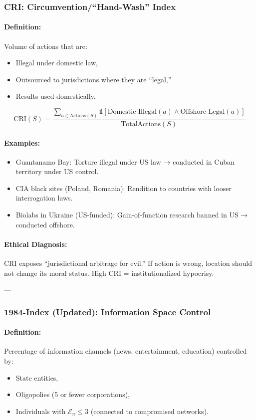 \documentclass[11pt,a4paper]{article}
\theoremstyle{definition}
\theoremstyle{remark}
\begin{document}
\subsubsection{CRI: Circumvention/``Hand-Wash'' Index}

\paragraph{Definition:}
Volume of actions that are:
\begin{itemize}
\item Illegal under domestic law,
\item Outsourced to jurisdictions where they are ``legal,''
\item Results used domestically.
\end{itemize}

\[
\text{CRI}(S) = \frac{\sum_{a \in \text{Actions}(S)} \mathbb{1}[\text{Domestic-Illegal}(a) \land \text{Offshore-Legal}(a)]}{\text{TotalActions}(S)}
\]

\paragraph{Examples:}
\begin{itemize}
\item Guantanamo Bay: Torture illegal under US law → conducted in Cuban territory under US control.
\item CIA black sites (Poland, Romania): Rendition to countries with looser interrogation laws.
\item Biolabs in Ukraine (US-funded): Gain-of-function research banned in US → conducted offshore.
\end{itemize}

\paragraph{Ethical Diagnosis:}
CRI exposes ``jurisdictional arbitrage for evil.'' If action is wrong, location should not change its moral status. High CRI = institutionalized hypocrisy.

---

\subsubsection{1984-Index (Updated): Information Space Control}

\paragraph{Definition:}
Percentage of information channels (news, entertainment, education) controlled by:
\begin{itemize}
\item State entities,
\item Oligopolies (5 or fewer corporations),
\item Individuals with $\mathcal{E}_n \leq 3$ (connected to compromised networks).
\end{itemize}
\end{document}
